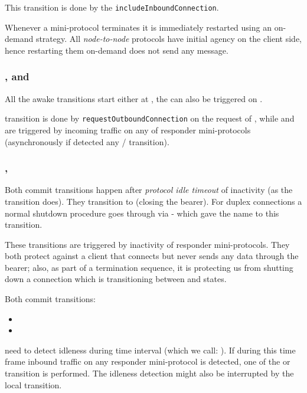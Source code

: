\begin{detail}
This transition is done by the \texttt{includeInboundConnection}.
\end{detail}

\begin{detail}
  Whenever a mini-protocol terminates it is immediately restarted using
  an on-demand strategy. All \textit{node-to-node} protocols have initial agency
  on the client side, hence restarting them on-demand does not send any
  message.
\end{detail}


\subsubsection{\AwakeDupLoc{}, \AwakeDupRem{} and \AwakeUniRem{}}
All the awake transitions start either at \InboundIdleStateAny{}, the
\AwakeDupRem{} can also be triggered on \OutboundIdleStateDup{}.

\begin{detail}
  \AwakeDupLoc{} transition is done by \texttt{requestOutboundConnection} on
  the request of \ptopgov{}, while \AwakeDupRem{} and \AwakeUniRem{} are
  triggered by incoming traffic on any of responder mini-protocols (asynchronously if
  detected any \warm{}/\hot{} transition).
\end{detail}


\subsubsection{\CommitUniRem{}, \CommitDupRem{}}\label{sec:tr_commit}
Both commit transitions happen after \textit{protocol idle timeout} of
inactivity (as the \TimeoutExpired{} transition does). They transition to
\TerminatingState{} (closing the bearer). For duplex connections a normal
shutdown procedure goes through \InboundIdleStateDup{}
via \CommitDupRem{} - which gave the name to this transition.

These transitions are triggered by inactivity of responder mini-protocols. They
both protect against a client that connects but never sends any data through
the bearer; also, as part of a termination sequence, it is protecting us from
shutting down a connection which is transitioning between \warm{} and \hot{}
states.

Both commit transitions:
\begin{itemize}
  \item \CommitDupRem{}
  \item \CommitUniRem{}
\end{itemize}
need to detect idleness during time interval (which we call: ). If during this time frame inbound traffic on any responder
mini-protocol is detected, one of the \AwakeDupRem{} or \AwakeUniRem{}
transition is performed. The idleness detection might also be interrupted by
the local \AwakeDupLoc{} transition.

